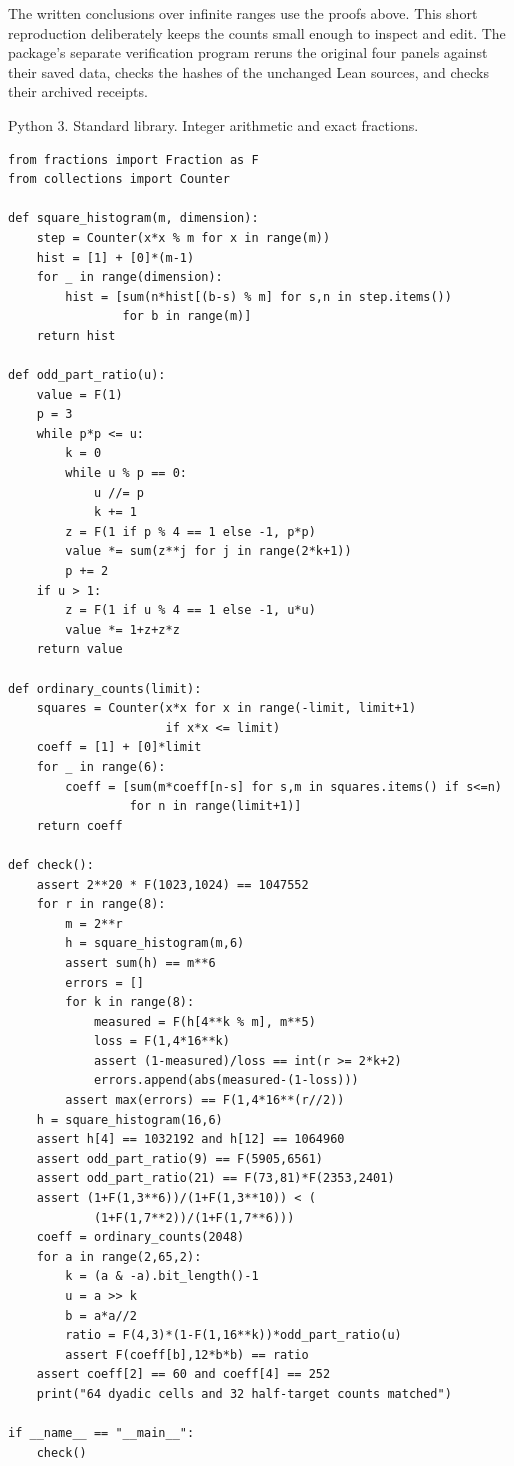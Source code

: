 \documentclass[12pt,letterpaper]{article}
\begin{document}
The written conclusions over infinite ranges use the proofs above. This short reproduction deliberately keeps the counts small enough to inspect and edit. The package's separate verification program reruns the original four panels against their saved data, checks the hashes of the unchanged Lean sources, and checks their archived receipts.

{\small\sffamily\color{accent}Python 3. Standard library. Integer arithmetic and exact fractions.}\par
{\fontsize{8.8}{10.7}\selectfont
\begin{verbatim}
from fractions import Fraction as F
from collections import Counter

def square_histogram(m, dimension):
    step = Counter(x*x % m for x in range(m))
    hist = [1] + [0]*(m-1)
    for _ in range(dimension):
        hist = [sum(n*hist[(b-s) % m] for s,n in step.items())
                for b in range(m)]
    return hist

def odd_part_ratio(u):
    value = F(1)
    p = 3
    while p*p <= u:
        k = 0
        while u % p == 0:
            u //= p
            k += 1
        z = F(1 if p % 4 == 1 else -1, p*p)
        value *= sum(z**j for j in range(2*k+1))
        p += 2
    if u > 1:
        z = F(1 if u % 4 == 1 else -1, u*u)
        value *= 1+z+z*z
    return value

def ordinary_counts(limit):
    squares = Counter(x*x for x in range(-limit, limit+1)
                      if x*x <= limit)
    coeff = [1] + [0]*limit
    for _ in range(6):
        coeff = [sum(m*coeff[n-s] for s,m in squares.items() if s<=n)
                 for n in range(limit+1)]
    return coeff

def check():
    assert 2**20 * F(1023,1024) == 1047552
    for r in range(8):
        m = 2**r
        h = square_histogram(m,6)
        assert sum(h) == m**6
        errors = []
        for k in range(8):
            measured = F(h[4**k % m], m**5)
            loss = F(1,4*16**k)
            assert (1-measured)/loss == int(r >= 2*k+2)
            errors.append(abs(measured-(1-loss)))
        assert max(errors) == F(1,4*16**(r//2))
    h = square_histogram(16,6)
    assert h[4] == 1032192 and h[12] == 1064960
    assert odd_part_ratio(9) == F(5905,6561)
    assert odd_part_ratio(21) == F(73,81)*F(2353,2401)
    assert (1+F(1,3**6))/(1+F(1,3**10)) < (
            (1+F(1,7**2))/(1+F(1,7**6)))
    coeff = ordinary_counts(2048)
    for a in range(2,65,2):
        k = (a & -a).bit_length()-1
        u = a >> k
        b = a*a//2
        ratio = F(4,3)*(1-F(1,16**k))*odd_part_ratio(u)
        assert F(coeff[b],12*b*b) == ratio
    assert coeff[2] == 60 and coeff[4] == 252
    print("64 dyadic cells and 32 half-target counts matched")

if __name__ == "__main__":
    check()
\end{verbatim}
}
\end{document}
